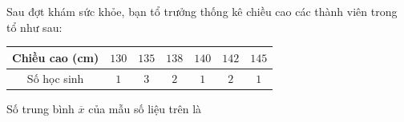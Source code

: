 \begin{ex}
Sau đợt khám sức khỏe, bạn tổ trưởng thống kê chiều cao các thành viên trong tổ như sau:
\begin{center}
\begin{tabular}{|c|c|c|c|c|c|c|}\hline
Chiều cao (cm) & $130$ & $135$ & $138$ & $140$ & $142$ & $145$\\\hline
Số học sinh & $1$ & $3$ & $2$ & $1$ & $2$ & $1$\\\hline
\end{tabular}
\end{center}
Số trung bình $\overline x$ của mẫu số liệu trên là
\end{ex}
